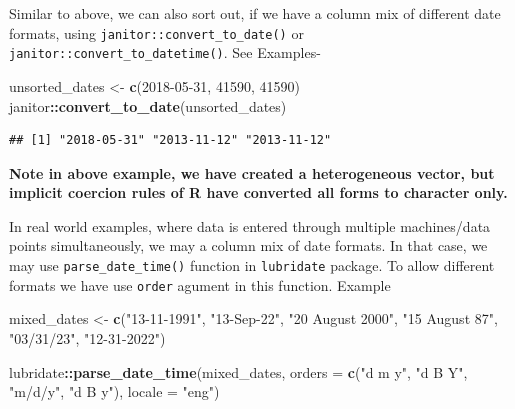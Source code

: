 \documentclass[
]{book}
\newenvironment{Shaded}{\begin{snugshade}}{\end{snugshade}}
\newcommand{\AttributeTok}[1]{\textcolor[rgb]{0.13,0.29,0.53}{#1}}
\newcommand{\DecValTok}[1]{\textcolor[rgb]{0.00,0.00,0.81}{#1}}
\newcommand{\FunctionTok}[1]{\textcolor[rgb]{0.13,0.29,0.53}{\textbf{#1}}}
\newcommand{\NormalTok}[1]{#1}
\newcommand{\OtherTok}[1]{\textcolor[rgb]{0.56,0.35,0.01}{#1}}
\newcommand{\SpecialCharTok}[1]{\textcolor[rgb]{0.81,0.36,0.00}{\textbf{#1}}}
\newcommand{\StringTok}[1]{\textcolor[rgb]{0.31,0.60,0.02}{#1}}
\begin{document}
Similar to above, we can also sort out, if we have a column mix of different date formats, using \texttt{janitor::convert\_to\_date()} or \texttt{janitor::convert\_to\_datetime()}. See Examples-

\begin{Shaded}
\begin{Highlighting}[]
\NormalTok{unsorted\_dates }\OtherTok{\textless{}{-}} \FunctionTok{c}\NormalTok{(}\StringTok{\textquotesingle{}2018{-}05{-}31\textquotesingle{}}\NormalTok{, }\StringTok{\textquotesingle{}41590\textquotesingle{}}\NormalTok{, }\DecValTok{41590}\NormalTok{)}
\NormalTok{janitor}\SpecialCharTok{::}\FunctionTok{convert\_to\_date}\NormalTok{(unsorted\_dates)}
\end{Highlighting}
\end{Shaded}

\begin{verbatim}
## [1] "2018-05-31" "2013-11-12" "2013-11-12"
\end{verbatim}

\textbf{Note in above example, we have created a heterogeneous vector, but implicit coercion rules of R have converted all forms to character only.}

In real world examples, where data is entered through multiple machines/data points simultaneously, we may a column mix of date formats. In that case, we may use \texttt{parse\_date\_time()} function in \texttt{lubridate} package. To allow different formats we have use \texttt{order} agument in this function. Example

\begin{Shaded}
\begin{Highlighting}[]
\NormalTok{mixed\_dates }\OtherTok{\textless{}{-}} \FunctionTok{c}\NormalTok{(}\StringTok{"13{-}11{-}1991"}\NormalTok{, }\StringTok{"13{-}Sep{-}22"}\NormalTok{, }
                 \StringTok{"20 August 2000"}\NormalTok{, }\StringTok{"15 August 87"}\NormalTok{, }
                 \StringTok{"03/31/23"}\NormalTok{, }\StringTok{"12{-}31{-}2022"}\NormalTok{)}

\NormalTok{lubridate}\SpecialCharTok{::}\FunctionTok{parse\_date\_time}\NormalTok{(mixed\_dates,}
                           \AttributeTok{orders =} \FunctionTok{c}\NormalTok{(}\StringTok{"d m y"}\NormalTok{, }\StringTok{"d B Y"}\NormalTok{, }\StringTok{"m/d/y"}\NormalTok{, }\StringTok{"d B y"}\NormalTok{),}
                           \AttributeTok{locale =} \StringTok{"eng"}\NormalTok{)}
\end{Highlighting}
\end{Shaded}
\end{document}
